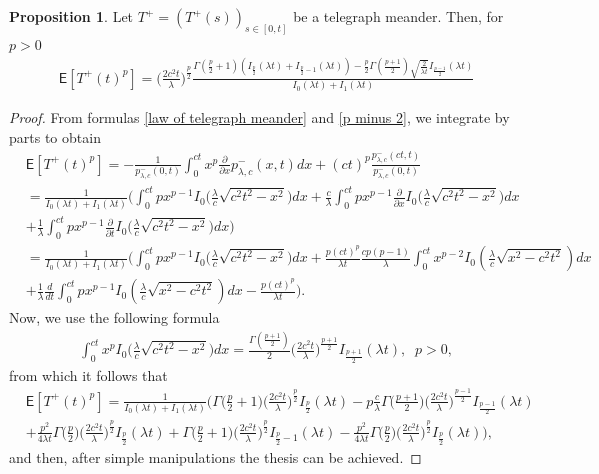 \documentclass{article}
\theoremstyle{definition}
\newtheorem{proposition}{Proposition}[section]
\numberwithin{equation}{section}
\begin{document}
\begin{proposition}\label{proposition moment telegraph process}
Let $T^+ = (T^+(s))_{s \in [0,t]}$ be a telegraph meander. Then, for $p>0$
\begin{align}\label{Telegraph meander moments 2}
&\mathsf{E}[T^+(t)^{p}] =\Big(\frac{2c^2t}{\lambda}\Big)^{\frac{p}{2}}\frac{\Gamma(\frac{p}{2}+1)(I_{\frac{p}{2}}(\lambda t)+I_{\frac{p}{2}-1}(\lambda t)) -\frac{p}{2}\Gamma(\frac{p+1}{2})\sqrt{\frac{2}{\lambda t}}I_{\frac{p-1}{2}}(\lambda t)}{I_0(\lambda t)+I_1(\lambda t)}
\end{align}
\end{proposition}
\begin{proof}
From formulas \eqref{law of telegraph meander} and \eqref{p minus 2}, we integrate by parts to obtain
\begin{align*}
&\mathsf{E}[T^+(t)^{p}] = -\frac{1}{p^{-}_{\lambda,c}(0,t)}\int_{0}^{ct}x^{p}\frac{\partial}{\partial x}p^{-}_{\lambda,c}(x,t)dx +(ct)^{p} \frac{p^{-}_{\lambda,c}(ct,t)}{p^{-}_{\lambda,c}(0,t)}  \\
&=\frac{1}{I_{0}(\lambda t)+I_{1}(\lambda t)}\bigg(\int_{0}^{ct}px^{p-1}I_0\big(\frac{\lambda}{c}\sqrt{c^2t^2-x^2}\big)dx +\frac{c}{\lambda}\int_{0}^{ct}px^{p-1}\frac{\partial}{\partial x}I_0\big(\frac{\lambda}{c}\sqrt{c^2t^2-x^2}\big)dx \\&+\frac{1}{\lambda}\int_{0}^{ct}px^{p-1}\frac{\partial}{\partial t}I_0\big(\frac{\lambda}{c}\sqrt{c^2t^2-x^2}\big)dx \bigg) \\
&=\frac{1}{I_{0}(\lambda t)+I_{1}(\lambda t)}\bigg(\int_{0}^{ct}px^{p-1}I_0\big(\frac{\lambda}{c}\sqrt{c^2t^2-x^2}\big)dx +\frac{p(ct)^p}{\lambda t}\frac{cp(p-1)}{\lambda}\int_{0}^{ct}x^{p-2}I_0(\frac{\lambda}{c}\sqrt{x^2-c^2t^2})dx\\&+\frac{1}{\lambda}\frac{d}{dt}\int_{0}^{ct}px^{p-1}I_0(\frac{\lambda}{c}\sqrt{x^2-c^2t^2})dx - \frac{p(ct)^p}{\lambda t} \bigg).
\end{align*}
Now, we use the following formula 
\begin{align}\label{Lemma 1}
&\int_{0}^{ct}x^{p}I_0\big(\frac{\lambda}{c}\sqrt{c^2t^2-x^2}\big)dx = \frac{\Gamma(\frac{p+1}{2})}{2}\Big(\frac{2c^2t}{\lambda}\Big)^{\frac{p+1}{2}}I_{\frac{p+1}{2}}(\lambda t), \;\; p >0,
\end{align}
from which it follows that
\begin{align*}
&\mathsf{E}[T^+(t)^{p}]=\frac{1}{I_{0}(\lambda t)+I_{1}(\lambda t)}\bigg(\Gamma\Big(\frac{p}{2}+1\Big)\Big(\frac{2c^2t}{\lambda}\Big)^{\frac{p}{2}}I_{\frac{p}{2}}(\lambda t) -p\frac{c}{\lambda}\Gamma\Big(\frac{p+1}{2}\Big)\Big(\frac{2c^2t}{\lambda}\Big)^{\frac{p-1}{2}}I_{\frac{p-1}{2}}(\lambda t)  \\
&+\frac{p^2}{4\lambda t}\Gamma\Big(\frac{p}{2}\Big)\Big(\frac{2c^2t}{\lambda}\Big)^{\frac{p}{2}} I_{\frac{p}{2}}(\lambda t)+\Gamma\Big(\frac{p}{2}+1\Big)\Big(\frac{2c^2t}{\lambda}\Big)^{\frac{p}{2}}I_{\frac{p}{2}-1}(\lambda t)-\frac{p^2}{4\lambda t}\Gamma\Big(\frac{p}{2}\Big)\Big(\frac{2c^2t}{\lambda}\Big)^{\frac{p}{2}}I_{\frac{p}{2}}(\lambda t)\bigg),
\end{align*}
and then, after simple manipulations the thesis can be achieved.
\end{proof}
\end{document}
